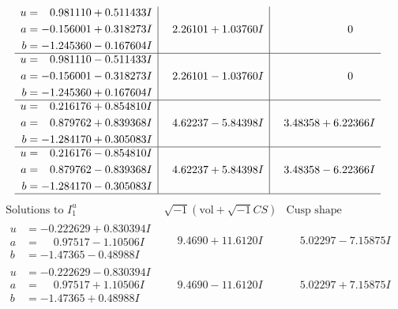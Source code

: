 \documentclass[1p]{elsarticle_modified}
\theoremstyle{definition}
\newcommand{\I}{\sqrt{-1}}
\begin{document}
$$\begin{array}{c|c|c}
\begin{aligned}
u &= \phantom{-}0.981110 + 0.511433 I \\
a &= -0.156001 + 0.318273 I \\
b &= -1.245360 - 0.167604 I\end{aligned}
 & \phantom{-}2.26101 + 1.03760 I & \phantom{-0.000000 } 0 \\ \hline\begin{aligned}
u &= \phantom{-}0.981110 - 0.511433 I \\
a &= -0.156001 - 0.318273 I \\
b &= -1.245360 + 0.167604 I\end{aligned}
 & \phantom{-}2.26101 - 1.03760 I & \phantom{-0.000000 } 0 \\ \hline\begin{aligned}
u &= \phantom{-}0.216176 + 0.854810 I \\
a &= \phantom{-}0.879762 + 0.839368 I \\
b &= -1.284170 + 0.305083 I\end{aligned}
 & \phantom{-}4.62237 - 5.84398 I & \phantom{-}3.48358 + 6.22366 I \\ \hline\begin{aligned}
u &= \phantom{-}0.216176 - 0.854810 I \\
a &= \phantom{-}0.879762 - 0.839368 I \\
b &= -1.284170 - 0.305083 I\end{aligned}
 & \phantom{-}4.62237 + 5.84398 I & \phantom{-}3.48358 - 6.22366 I\\
 \hline 
 \end{array}$$\newpage$$\begin{array}{c|c|c}  
\text{Solutions to }I^u_{1}& \I (\text{vol} + \sqrt{-1}CS) & \text{Cusp shape}\\
 \hline 
\begin{aligned}
u &= -0.222629 + 0.830394 I \\
a &= \phantom{-}0.97517 - 1.10506 I \\
b &= -1.47365 - 0.48988 I\end{aligned}
 & \phantom{-}9.4690 + 11.6120 I & \phantom{-}5.02297 - 7.15875 I \\ \hline\begin{aligned}
u &= -0.222629 - 0.830394 I \\
a &= \phantom{-}0.97517 + 1.10506 I \\
b &= -1.47365 + 0.48988 I\end{aligned}
 & \phantom{-}9.4690 - 11.6120 I & \phantom{-}5.02297 + 7.15875 I \\ \hline\begin{aligned}

\end{aligned}
\end{array}$$
\end{document}
